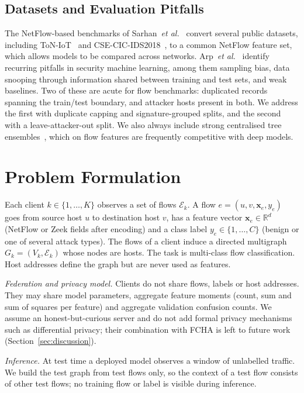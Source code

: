 \documentclass[journal]{IEEEtran}
\begin{document}
\subsection{Datasets and Evaluation Pitfalls}
The NetFlow-based benchmarks of Sarhan~\emph{et al.}~\cite{sarhan2021netflow,sarhan2022standard} convert several public datasets, including ToN-IoT~\cite{moustafa2021toniot,alsaedi2020toniot} and CSE-CIC-IDS2018~\cite{sharafaldin2018cicids}, to a common NetFlow feature set, which allows models to be compared across networks. Arp~\emph{et al.}~\cite{arp2022dos} identify recurring pitfalls in security machine learning, among them sampling bias, data snooping through information shared between training and test sets, and weak baselines. Two of these are acute for flow benchmarks: duplicated records spanning the train/test boundary, and attacker hosts present in both. We address the first with duplicate capping and signature-grouped splits, and the second with a leave-attacker-out split. We also always include strong centralised tree ensembles~\cite{breiman2001rf,chen2016xgboost}, which on flow features are frequently competitive with deep models.

\section{Problem Formulation}
\label{sec:problem}
Each client $k\in\{1,\dots,K\}$ observes a set of flows $\mathcal{E}_k$. A flow $e=(u,v,\mathbf{x}_e,y_e)$ goes from source host $u$ to destination host $v$, has a feature vector $\mathbf{x}_e\in\mathbb{R}^d$ (NetFlow or Zeek fields after encoding) and a class label $y_e\in\{1,\dots,C\}$ (benign or one of several attack types). The flows of a client induce a directed multigraph $G_k=(V_k,\mathcal{E}_k)$ whose nodes are hosts. The task is multi-class flow classification. Host addresses define the graph but are never used as features.

\emph{Federation and privacy model.} Clients do not share flows, labels or host addresses. They may share model parameters, aggregate feature moments (count, sum and sum of squares per feature) and aggregate validation confusion counts. We assume an honest-but-curious server and do not add formal privacy mechanisms such as differential privacy; their combination with FCHA is left to future work (Section~\ref{sec:discussion}).

\emph{Inference.} At test time a deployed model observes a window of unlabelled traffic. We build the test graph from test flows only, so the context of a test flow consists of other test flows; no training flow or label is visible during inference.
\end{document}
